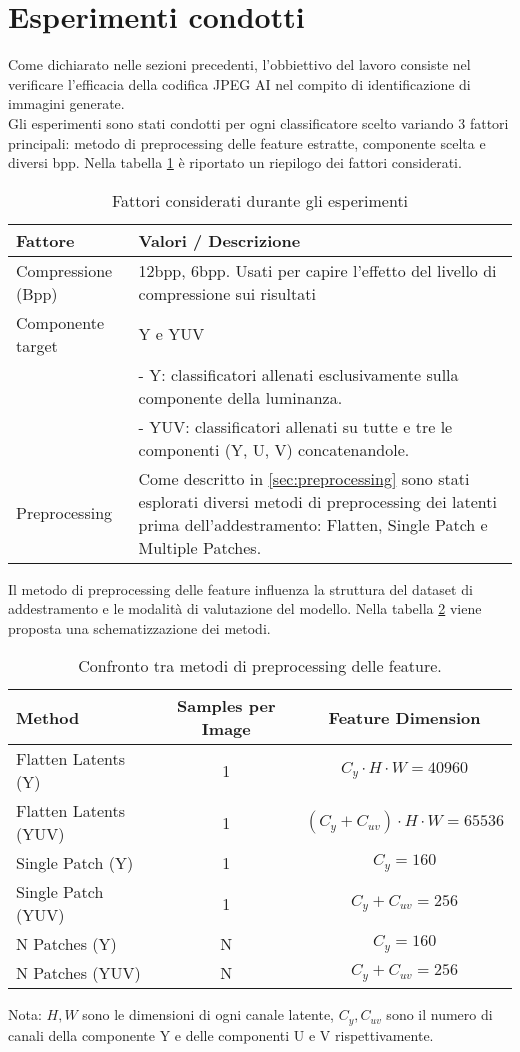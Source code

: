 \section{Esperimenti condotti}\label{sec:experiments}
Come dichiarato nelle sezioni precedenti, l'obbiettivo del lavoro consiste nel verificare l'efficacia della codifica JPEG AI nel compito di identificazione di immagini generate.\\
Gli esperimenti sono stati condotti per ogni classificatore scelto variando 3 fattori principali:  metodo di preprocessing delle feature estratte, componente scelta e diversi bpp. Nella tabella \ref{tab:experimentalfactors} è riportato un riepilogo dei fattori considerati.
\begin{table}[H]
\centering
\caption{Fattori considerati durante gli esperimenti}\label{tab:experimentalfactors}
\begin{tabularx}{\textwidth}{l X}
\toprule
\textbf{Fattore} & \textbf{Valori / Descrizione} \\
\midrule
Compressione (Bpp) & 12bpp, 6bpp. Usati per capire l'effetto del livello di compressione sui risultati \\
\midrule
Componente target & Y e YUV \\
& - Y: classificatori allenati esclusivamente sulla componente della luminanza. \\
& - YUV: classificatori allenati su tutte e tre le componenti (Y, U, V) concatenandole. \\
\midrule
Preprocessing & Come descritto in \ref{sec:preprocessing} sono stati esplorati diversi metodi di preprocessing dei latenti prima dell'addestramento: Flatten, Single Patch e Multiple Patches. \\
\bottomrule
\end{tabularx}
\end{table}
Il metodo di preprocessing delle feature influenza la struttura del dataset di addestramento e le modalità di valutazione del modello. Nella tabella \ref{tab:preprocessing_methods} viene proposta una schematizzazione dei metodi.
\begin{table}[H]
\centering
\caption{Confronto tra metodi di preprocessing delle feature.}\label{tab:preprocessing_methods}
\begin{tabularx}{\textwidth}{l c c}
\toprule
\textbf{Method} & \textbf{Samples per Image} & \textbf{Feature Dimension} \\
\midrule
Flatten Latents (Y)        & 1 & $C_y \cdot H \cdot W = 40960$ \\
Flatten Latents (YUV)     & 1 & $(C_y +C_{uv})\cdot H \cdot W = 65536$ \\
Single Patch (Y)        & 1 & $C_y = 160$ \\
Single Patch (YUV)     & 1 & $C_y + C_{uv} = 256$ \\
N Patches (Y)    & N & $C_y = 160$ \\
N Patches (YUV)        & N & $C_y + C_{uv} = 256$ \\
\bottomrule
\end{tabularx}
\small{Nota: $H,W$ sono le dimensioni di ogni canale latente, $C_y, C_{uv}$ sono il numero di canali della componente Y e delle componenti U e V rispettivamente.}
\end{table}
